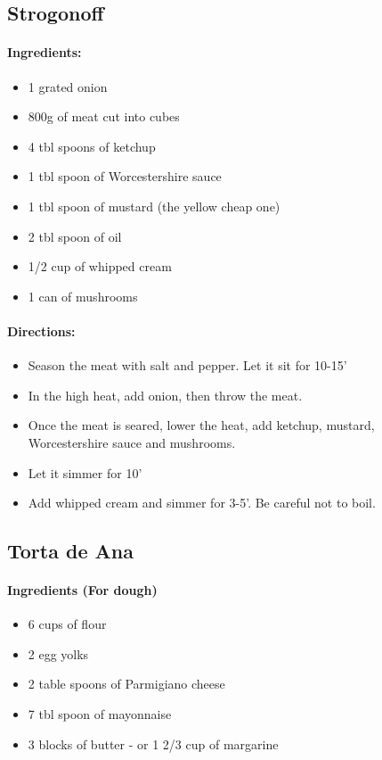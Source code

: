 \documentclass{article}
\begin{document}
\subsection{Strogonoff}

\paragraph{Ingredients:}

\begin{itemize}
	\item 1 grated onion
	\item 800g of meat cut into cubes
	\item 4 tbl spoons of ketchup
	\item 1 tbl spoon of Worcestershire sauce
	\item 1 tbl spoon of mustard (the yellow cheap one)
	\item 2 tbl spoon of oil
	\item 1/2 cup of whipped cream
	\item 1 can of mushrooms
\end{itemize}

\paragraph{Directions:}
\begin{itemize}
	\item Season the meat with salt and pepper. Let it sit for 10-15'
	\item In the high heat, add onion, then throw the meat. 
	\item Once the meat is seared, lower the heat, add ketchup, mustard, Worcestershire sauce and mushrooms.
	\item Let it simmer for 10'
	\item Add whipped cream and simmer for 3-5'. Be careful not to boil.
\end{itemize}

\subsection{Torta de Ana}

\paragraph{Ingredients (For dough)}

\begin{itemize}
	\item 6 cups of flour
	\item 2 egg yolks
	\item 2 table spoons of Parmigiano cheese
	\item 7 tbl spoon of mayonnaise
	\item 3 blocks of butter - or 1 2/3 cup of margarine
\end{itemize}
\end{document}
